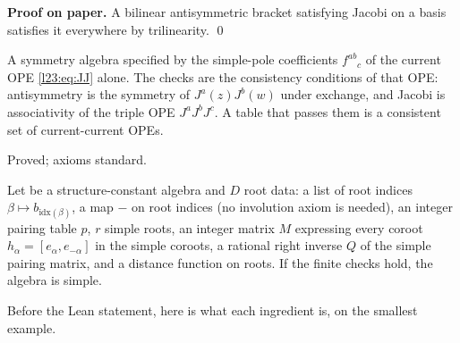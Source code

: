 \textbf{Proof on paper.} A bilinear antisymmetric bracket satisfying Jacobi on a basis satisfies it everywhere by trilinearity. \qed

\begin{physics}
A symmetry algebra specified by the simple-pole coefficients $f^{ab}{}_c$ of the current OPE \eqref{l23:eq:JJ} alone. The checks are the
consistency conditions of that OPE: antisymmetry is the symmetry of $J^a(z)J^b(w)$ under exchange, and Jacobi is associativity of the
triple OPE $J^aJ^bJ^c$. A table that passes them is a consistent set of current-current OPEs.
\end{physics}

\begin{status}
Proved; axioms standard.
\end{status}

\begin{theorem}\label{l23:thm:sctables}
Let  be a structure-constant algebra and $D$ root data: a list of root indices $\beta\mapsto b_{\mathrm{idx}(\beta)}$, a
map $-$ on root indices (no involution axiom is needed), an integer pairing table $p$, $r$ simple roots, an integer matrix $M$ expressing every coroot $h_\alpha=[e_\alpha,e_{-\alpha}]$ in
the simple coroots, a rational right inverse $Q$ of the simple pairing matrix, and a distance function on roots. If the finite checks
 hold, the algebra is simple.
\end{theorem}

Before the Lean statement, here is what each ingredient is, on the smallest example.

